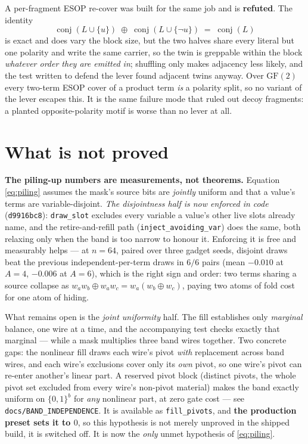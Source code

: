 \documentclass[11pt]{article}
\newcommand{\xor}{\oplus}
\newcommand{\code}[1]{\texttt{#1}}
\begin{document}
A per-fragment ESOP re-cover was built for the same job and is \textbf{refuted}.
The identity
\[
  \operatorname{conj}(L \cup \{u\}) \;\oplus\; \operatorname{conj}(L \cup \{\lnot u\}) \;=\; \operatorname{conj}(L)
\]
is exact and does vary the block size, but the two halves share every literal
but one polarity and write the same carrier, so the twin is greppable within
the block \emph{whatever order they are emitted in}; shuffling only makes
adjacency less likely, and the test written to defend the lever found adjacent
twins anyway. Over $\mathrm{GF}(2)$ every two-term ESOP cover of a product term
\emph{is} a polarity split, so no variant of the lever escapes this. It is the
same failure mode that ruled out decoy fragments: a planted opposite-polarity
motif is worse than no lever at all.

\section{What is not proved}
\label{sec:limits}

\textbf{The piling-up numbers are measurements, not theorems.} Equation
\eqref{eq:piling} assumes the mask's source bits are \emph{jointly} uniform and
that a value's terms are variable-disjoint. \emph{The disjointness half is now
enforced in code} (\code{d9916bc8}): \code{draw\_slot} excludes every variable a
value's other live slots already name, and the retire-and-refill path
(\code{inject\_avoiding\_var}) does the same, both relaxing only when the band is
too narrow to honour it. Enforcing it is free and measurably helps --- at
$n{=}64$, paired over three gadget seeds, disjoint draws beat the previous
independent-per-term draws in $6/6$ pairs (mean $-0.010$ at $A{=}4$, $-0.006$ at
$A{=}6$), which is the right sign and order: two terms sharing a source collapse
as $w_a w_b \xor w_a w_c = w_a(w_b \xor w_c)$, paying two atoms of fold cost for
one atom of hiding.

What remains open is the \emph{joint uniformity} half. The fill establishes only
\emph{marginal} balance, one wire at a time, and the accompanying test checks
exactly that marginal --- while a mask multiplies three band wires together. Two
concrete gaps: the nonlinear fill draws each wire's pivot \emph{with} replacement
across band wires, and each wire's exclusions cover only its \emph{own} pivot, so
one wire's pivot can re-enter another's linear part. A reserved pivot block
(distinct pivots, the whole pivot set excluded from every wire's non-pivot
material) makes the band exactly uniform on $\{0,1\}^b$ for \emph{any} nonlinear
part, at zero gate cost --- see \code{docs/BAND\_INDEPENDENCE}. It is available
as \code{fill\_pivots}, and \textbf{the production preset sets it to $0$}, so
this hypothesis is not merely unproved in the shipped build, it is switched off.
It is now the \emph{only} unmet hypothesis of \eqref{eq:piling}.
\end{document}
